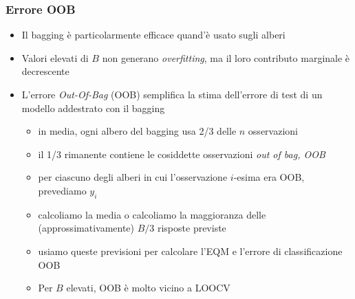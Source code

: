 \begin{frame}
	\frametitle{Errore OOB}
	
	\begin{itemize}
		\item Il bagging è particolarmente efficace quand'è usato sugli alberi
		\item Valori elevati di $B$ non generano \emph{overfitting}, ma il loro contributo marginale è decrescente
		\item L'errore \emph{Out-Of-Bag} (OOB) semplifica la stima dell'errore di test di un modello addestrato con il bagging
		\begin{itemize}
			\item in media, ogni albero del bagging usa 2/3 delle $n$ osservazioni
			\item il 1/3 rimanente contiene le cosiddette osservazioni \emph{out of bag, OOB}
			\item per ciascuno degli alberi in cui l'osservazione $i$-esima era OOB, prevediamo $y_i$
			\item calcoliamo la media o calcoliamo la maggioranza delle (approssimativamente) $B/3$ risposte previste
			\item usiamo queste previsioni per calcolare l'EQM  e l'errore di classificazione OOB
			\item Per $B$ elevati, OOB è molto vicino a LOOCV
		\end{itemize}
	\end{itemize}
\end{frame}


